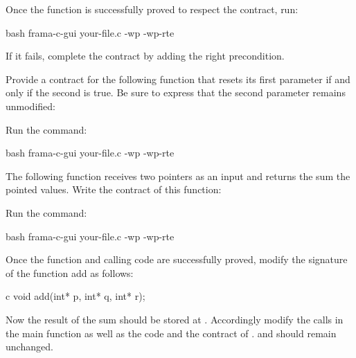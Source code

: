 Once the function is successfully proved to respect the contract, run:


\begin{CodeBlock}{bash}
frama-c-gui your-file.c -wp -wp-rte
\end{CodeBlock}


If it fails, complete the contract by adding the right precondition.






Provide a contract for the following function that resets its first parameter
if and only if the second is true. Be sure to express that the second parameter
remains unmodified:




Run the command:


\begin{CodeBlock}{bash}
frama-c-gui your-file.c -wp -wp-rte
\end{CodeBlock}





The following function receives two pointers as an input and returns the
sum the pointed values. Write the contract of this function:






Run the command:



\begin{CodeBlock}{bash}
frama-c-gui your-file.c -wp -wp-rte
\end{CodeBlock}



Once the function and calling code are successfully proved, modify the
signature of the function add as follows:



\begin{CodeBlock}{c}
void add(int* p, int* q, int* r);
\end{CodeBlock}


Now the result of the sum should be stored at . Accordingly
modify the calls in the main function as well as the code and the contract
of .  and  should remain
unchanged.



